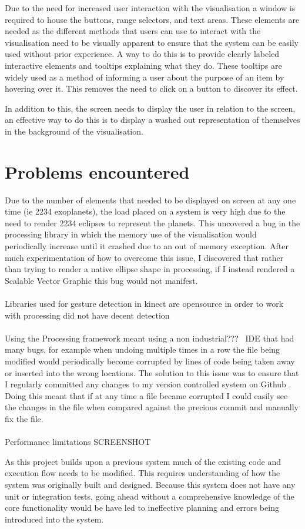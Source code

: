 Due to the need for increased user interaction with the visualisation a window
is required to house the buttons, range selectors, and text areas. These
elements are needed as the different methods that users can use to interact with
the visualisation need to be visually apparent to ensure that the system can be
easily used without prior experience. A way to do this is to provide clearly
labeled interactive elements and tooltips explaining what they
do. These tooltips are widely used as a method of informing a
user about the purpose of an item by hovering over it. This removes the need to
click on a button to discover its effect.


In addition to this, the screen needs to display the user in relation to the
screen, an effective way to do this is to display a washed out representation of
themselves in the background of the visualisation.
\section{Problems encountered}
Due to the number of elements that needed to be displayed on screen at any one
time (ie 2234 exoplanets), the load placed on a system is very high due to the
need to render 2234 eclipses to represent the planets. This uncovered a bug in
the processing library in which the memory use of the visualisation would
periodically increase until it crashed due to an out of memory exception. After
much experimentation of how to overcome this issue, I discovered that rather
than trying to render a native ellipse shape in processing, if I instead rendered
a Scalable Vector Graphic this bug would not manifest. 
\\\\
Libraries used for gesture detection in kinect are opensource in order to work
with processing did not have decent detection
\\\\
Using the Processing framework meant using a non industrial???~ IDE that had
many bugs, for example when undoing multiple times in a row the file being
modified would periodically become corrupted by lines of code being taken away
or inserted into the wrong locations. The solution to this issue was to ensure
that I regularly committed any changes to my version controlled system on Github
\cite{github}. Doing this meant that if at any time a file became corrupted I
could easily see the changes in the file when compared against the precious
commit and manually fix the file. 
\\\\
Performance limitations
SCREENSHOT ~

As this project builds upon a previous system much of the existing code and
execution flow needs to be modified. This requires understanding of how the
system was originally built and designed. Because this system does not have any
unit or integration tests, going ahead without a comprehensive knowledge of the
core functionality would be have led to ineffective planning and errors being
introduced into the system.
